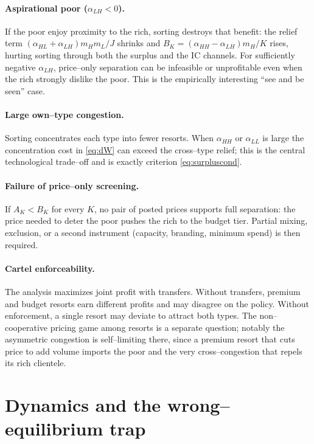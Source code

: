 \documentclass[11pt]{article}
\theoremstyle{plain}
\theoremstyle{definition}
\theoremstyle{remark}
\newcommand{\mH}{m_{H}}
\newcommand{\mL}{m_{L}}
\newcommand{\aHH}{\alpha_{HH}}
\newcommand{\aHL}{\alpha_{HL}}
\newcommand{\aLH}{\alpha_{LH}}
\newcommand{\aLL}{\alpha_{LL}}
\begin{document}
\paragraph{Aspirational poor ($\aLH<0$).}
If the poor enjoy proximity to the rich, sorting destroys that benefit: the relief term
$(\aHL+\aLH)\mH\mL/J$ shrinks and $B_K=(\aHH-\aLH)\mH/K$ rises, hurting sorting through both the
surplus and the IC channels. For sufficiently negative $\aLH$, price--only separation can be
infeasible or unprofitable even when the rich strongly dislike the poor. This is the empirically
interesting ``see and be seen'' case.

\paragraph{Large own--type congestion.}
Sorting concentrates each type into fewer resorts. When $\aHH$ or $\aLL$ is large the
concentration cost in \eqref{eq:dW} can exceed the cross--type relief; this is the central
technological trade--off and is exactly criterion \eqref{eq:surpluscond}.

\paragraph{Failure of price--only screening.}
If $A_K<B_K$ for every $K$, no pair of posted prices supports full separation: the price needed
to deter the poor pushes the rich to the budget tier. Partial mixing, exclusion, or a second
instrument (capacity, branding, minimum spend) is then required.

\paragraph{Cartel enforceability.}
The analysis maximizes joint profit with transfers. Without transfers, premium and budget
resorts earn different profits and may disagree on the policy. Without enforcement, a single
resort may deviate to attract both types. The non--cooperative pricing game among resorts is a
separate question; notably the asymmetric congestion is self--limiting there, since a premium
resort that cuts price to add volume imports the poor and the very cross--congestion that
repels its rich clientele.

\section{Dynamics and the wrong--equilibrium trap}\label{sec:dynamics}
\end{document}
